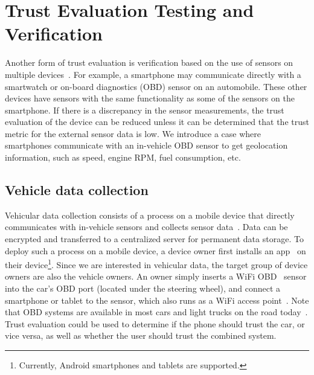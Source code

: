 \section{Trust Evaluation Testing and Verification}
\label{sec:geolocation}
Another form of trust evaluation is verification based on the use of sensors on multiple devices~\cite{ju2012neteye}.  For example,
a smartphone may communicate directly with a smartwatch or on-board diagnostics (OBD)
sensor on an automobile.  These other devices have sensors with the same
functionality as some of the sensors on the smartphone.  If there is a discrepancy in the sensor measurements, 
the trust evaluation of the device can be reduced unless it can be determined that the trust metric for the 
external sensor data is low.
We introduce a case where smartphones communicate with an in-vehicle OBD sensor
to get geolocation information, such as speed, engine RPM, fuel consumption, 
etc.

\subsection{Vehicle data collection}

Vehicular data collection consists of a process on a mobile 
device that directly communicates with in-vehicle sensors and collects sensor 
data~\cite{sensor}. Data can be encrypted and transferred to a
centralized server for permanent data storage. 
To deploy such a process on a mobile device, a device owner first installs an
app~\cite{sensor-app} on their device\footnote{Currently, Android smartphones 
and tablets are supported.}. Since we are interested in
vehicular data, the target group of device owners are also the vehicle 
owners. An owner simply inserts a WiFi 
OBD~\cite{obd} sensor into the car's OBD port (located under the steering wheel),  
and connect a 
smartphone or tablet to the sensor, which also runs as a WiFi access 
point~\cite{reininger2015first}. Note that OBD systems are available in most cars and light trucks 
on the road today~\cite{obdconnector}. 
Trust evaluation could be used to determine if the phone should trust the car,
or vice versa, as well as whether the user should trust the combined system.

